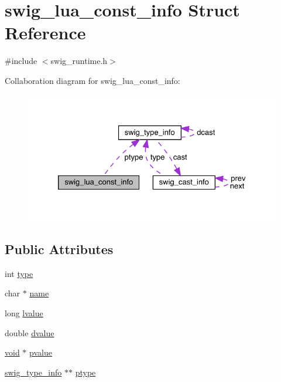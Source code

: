 \hypertarget{structswig__lua__const__info}{}\section{swig\+\_\+lua\+\_\+const\+\_\+info Struct Reference}
\label{structswig__lua__const__info}


{\ttfamily \#include $<$swig\+\_\+runtime.\+h$>$}



Collaboration diagram for swig\+\_\+lua\+\_\+const\+\_\+info\+:\nopagebreak
\begin{figure}[H]
\begin{center}
\leavevmode
\includegraphics[width=326pt]{structswig__lua__const__info__coll__graph}
\end{center}
\end{figure}
\subsection*{Public Attributes}
\begin{DoxyCompactItemize}
\item 
int \mbox{\hyperlink{structswig__lua__const__info_a1c9ffb014aea4d37c1b73e0a446c9be1}{type}}
\item 
char $\ast$ \mbox{\hyperlink{structswig__lua__const__info_aeab9027ebc600cf479ee0f977fd748b6}{name}}
\item 
long \mbox{\hyperlink{structswig__lua__const__info_a0f4d6393367808867778882594520a44}{lvalue}}
\item 
double \mbox{\hyperlink{structswig__lua__const__info_ac50e848b2a6a628fa1eeb4924f608cee}{dvalue}}
\item 
\mbox{\hyperlink{_thread_8h_af1e856da2e658414cb2456cb6f7ebc66}{void}} $\ast$ \mbox{\hyperlink{structswig__lua__const__info_a54637f2603b1179d4996c06e82e3f23a}{pvalue}}
\item 
\mbox{\hyperlink{structswig__type__info}{swig\+\_\+type\+\_\+info}} $\ast$$\ast$ \mbox{\hyperlink{structswig__lua__const__info_a0557056988d98840029075f204d2bf59}{ptype}}
\end{DoxyCompactItemize}


